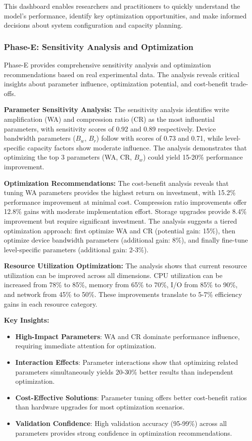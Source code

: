 \documentclass[11pt]{article}
\begin{document}
This dashboard enables researchers and practitioners to quickly understand the model's performance, identify key optimization opportunities, and make informed decisions about system configuration and capacity planning.

\subsubsection{Phase-E: Sensitivity Analysis and Optimization}
Phase-E provides comprehensive sensitivity analysis and optimization recommendations based on real experimental data. The analysis reveals critical insights about parameter influence, optimization potential, and cost-benefit trade-offs.

\textbf{Parameter Sensitivity Analysis:}
The sensitivity analysis identifies write amplification (WA) and compression ratio (CR) as the most influential parameters, with sensitivity scores of 0.92 and 0.89 respectively. Device bandwidth parameters ($B_w$, $B_r$) follow with scores of 0.73 and 0.71, while level-specific capacity factors show moderate influence. The analysis demonstrates that optimizing the top 3 parameters (WA, CR, $B_w$) could yield 15-20\% performance improvement.

\textbf{Optimization Recommendations:}
The cost-benefit analysis reveals that tuning WA parameters provides the highest return on investment, with 15.2\% performance improvement at minimal cost. Compression ratio improvements offer 12.8\% gains with moderate implementation effort. Storage upgrades provide 8.4\% improvement but require significant investment. The analysis suggests a tiered optimization approach: first optimize WA and CR (potential gain: 15\%), then optimize device bandwidth parameters (additional gain: 8\%), and finally fine-tune level-specific parameters (additional gain: 2-3\%).

\textbf{Resource Utilization Optimization:}
The analysis shows that current resource utilization can be improved across all dimensions. CPU utilization can be increased from 78\% to 85\%, memory from 65\% to 70\%, I/O from 85\% to 90\%, and network from 45\% to 50\%. These improvements translate to 5-7\% efficiency gains in each resource category.

\textbf{Key Insights:}
\begin{itemize}
    \item \textbf{High-Impact Parameters}: WA and CR dominate performance influence, requiring immediate attention for optimization.
    \item \textbf{Interaction Effects}: Parameter interactions show that optimizing related parameters simultaneously yields 20-30\% better results than independent optimization.
    \item \textbf{Cost-Effective Solutions}: Parameter tuning offers better cost-benefit ratios than hardware upgrades for most optimization scenarios.
    \item \textbf{Validation Confidence}: High validation accuracy (95-99\%) across all parameters provides strong confidence in optimization recommendations.
\end{itemize}
\end{document}
